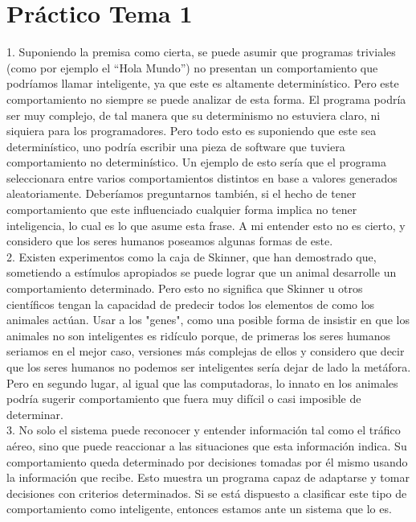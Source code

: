 \chapter{Práctico Tema 1}

1. Suponiendo la premisa como cierta, se puede asumir que programas triviales (como por ejemplo el “Hola Mundo”) no presentan un comportamiento que podríamos llamar inteligente, ya que este es altamente determinístico. Pero este comportamiento no siempre se puede analizar de esta forma. El programa podría ser muy complejo, de tal manera que su determinismo no estuviera claro, ni siquiera para los programadores. Pero todo esto es suponiendo que este sea determinístico, uno podría escribir una pieza de software que tuviera comportamiento no determinístico. Un ejemplo de esto sería que el programa seleccionara entre varios comportamientos distintos en base a valores generados aleatoriamente. Deberíamos preguntarnos también, si el hecho de tener comportamiento que este influenciado cualquier forma implica no tener inteligencia, lo cual es lo que asume esta frase. A mi entender esto no es cierto, y considero que los seres humanos poseamos algunas formas de este. \\

2. Existen experimentos como la caja de Skinner, que han demostrado que, sometiendo a estímulos apropiados se puede lograr que un animal desarrolle un comportamiento determinado. Pero esto no significa que Skinner u otros científicos tengan la capacidad de predecir todos los elementos de como los animales actúan. Usar a los "genes", como una posible forma de insistir en que los animales no son inteligentes es ridículo porque, de primeras los seres humanos seriamos en el mejor caso, versiones más complejas de ellos y considero que decir que los seres humanos no podemos ser inteligentes sería dejar de lado la metáfora. Pero en segundo lugar, al igual que las computadoras, lo innato en los animales podría sugerir comportamiento que fuera muy difícil o casi imposible de determinar. \\

3. No solo el sistema puede reconocer y entender información tal como el tráfico aéreo, sino que puede reaccionar a las situaciones que esta información indica. Su comportamiento queda determinado por decisiones tomadas por él mismo usando la información que recibe. Esto muestra un programa capaz de adaptarse y tomar decisiones con criterios determinados. Si se está dispuesto a clasificar este tipo de comportamiento como inteligente, entonces estamos ante un sistema que lo es. \\

